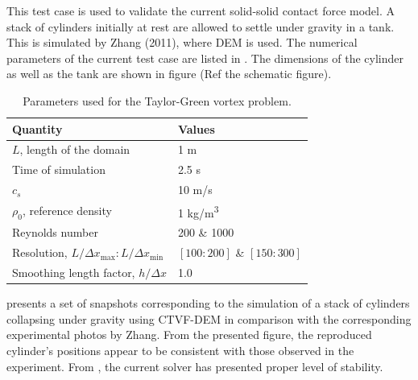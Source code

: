 \documentclass[preprint,12pt]{elsarticle}
\begin{document}
This test case is used to validate the current solid-solid contact force
model. A stack of cylinders initially at rest are allowed to settle under
gravity in a tank. This is simulated by Zhang (2011), where DEM is used. The
numerical parameters of the current test case are listed in
. The dimensions of the cylinder as well as the
tank are shown in figure (Ref the schematic figure).

\begin{table}[!ht]
  \centering
  \begin{tabular}[!ht]{ll}
    \toprule
    Quantity & Values\\
    \midrule
    $L$, length of the domain & 1 m \\
    Time of simulation & 2.5 s \\
    $c_s$ & 10 m/s \\
    $\rho_0$, reference density & 1 kg/m\textsuperscript{3} \\
    Reynolds number & 200 \& 1000 \\
    Resolution, $L/\Delta x_{\max} : L/\Delta x_{\min}$ & $[100:200]$ \& $[150:300]$\\
    Smoothing length factor, $h/\Delta x$ & 1.0\\
    \bottomrule
  \end{tabular}
  \caption{Parameters used for the Taylor-Green vortex problem.}%
  \label{tab:stack-of-cylinders}
\end{table}

 presents a set of snapshots
corresponding to the simulation of a stack of cylinders collapsing under
gravity using CTVF-DEM in comparison with the corresponding experimental
photos by Zhang. From the presented figure, the reproduced cylinder's
positions appear to be consistent with those observed in the experiment. From
, the current solver has presented
proper level of stability.
\end{document}
